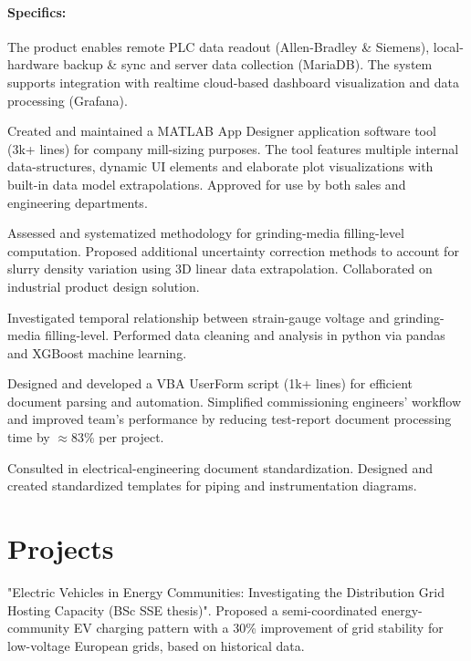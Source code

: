 \documentclass[]{plushcv}
\begin{document}
\begin{minipage}[t]{0.70\textwidth}
\begin{tightemize}
		\paragraph{Specifics:}\vspace*{-12pt}
		The product enables remote PLC data readout (Allen-Bradley \& Siemens), local-hardware backup \& sync and server data collection (MariaDB). The system supports integration with realtime cloud-based dashboard visualization and data processing (Grafana).
		\item Created and maintained a MATLAB App Designer application software tool (3k+ lines) for company mill-sizing purposes. The tool features multiple internal data-structures, dynamic UI elements and elaborate plot visualizations with built-in data model extrapolations. Approved for use by both sales and engineering departments.
		\item Assessed and systematized methodology for grinding-media filling-level computation. Proposed additional uncertainty correction methods to account for slurry density variation using 3D linear data extrapolation. Collaborated on industrial product design solution.
	\end{tightemize}
	\subskip
	
	\begin{tightemize}
		\item Investigated temporal relationship between strain-gauge voltage and grinding-media filling-level. Performed data cleaning and analysis in python via pandas and XGBoost machine learning.
		\item Designed and developed a VBA UserForm script (1k+ lines) for efficient document parsing and automation. Simplified commissioning engineers' workflow and improved team's performance by reducing test-report document processing time by $\approx$83\% per project. 
		\item Consulted in electrical-engineering document standardization. Designed and created standardized templates for piping and instrumentation diagrams.
	\end{tightemize}



\section{Projects}
	\begin{tightemize}
	\item "Electric Vehicles in Energy Communities: Investigating the Distribution Grid Hosting Capacity (BSc SSE thesis)".	Proposed a semi-coordinated energy-community EV charging pattern with a 30\% improvement of grid stability for low-voltage European grids, based on historical data.
	\end{tightemize}
	

\end{minipage}
\end{document}
